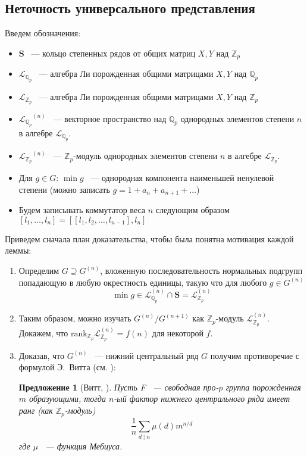 \documentclass[12pt,a4paper]{article}
\newtheorem{proposition}{Предложение}[section]
\newcommand{\Z}{\ensuremath{\mathbb{Z}}}
\newcommand{\Q}{\ensuremath{\mathbb{Q}}}
\newcommand{\LQ}{\ensuremath{\mathcal{L}_{\mathbb{Q}_p}}}
\newcommand{\LZ}{\ensuremath{\mathcal{L}_{\mathbb{Z}_p}}}
\newcommand{\LQn}{\ensuremath{\mathcal{L}^{(n)}_{\mathbb{Q}_p}}}
\newcommand{\LZn}{\ensuremath{\mathcal{L}^{(n)}_{\mathbb{Z}_p}}}
\newcommand{\Sbf}{\ensuremath{\mathbf{S}}}
\newcommand{\rank}{\ensuremath{\mathrm{rank}}}
\begin{document}
    \subsection{Неточность универсального представления}
    Введем обозначения:
    \begin{itemize}
        \item $\mathbf{S}$ ~--- кольцо степенных рядов от общих матриц $X, Y$ над $\Z_p$
        \item $\LQ$ ~--- алгебра Ли порожденная общими матрицами $X, Y$ над $\Q_p$
        \item $\LZ$ ~--- алгебра Ли порожденная общими матрицами $X, Y$ над $\Z_p$
        \item $\LQ^{(n)}$ ~--- векторное пространство над $\Q_p$ однородных элементов степени $n$ в алгебре $\LQ$.
        \item $\LZ^{(n)}$ ~---  $\Z_p$-модуль однородных элементов степени $n$ в алгебре $\LZ$.
        \item Для $g\in G$: $\min{g}$ ~--- однородная компонента наименьшей ненулевой степени (можно записать $g=1 + a_n + a_{n+1} + \ldots$)
        \item Будем записывать коммутатор веса $n$ следующим образом $[l_1, \ldots, l_n] = [[l_1, l_2, \ldots, l_{n-1}], l_n]$
    \end{itemize}
    Приведем сначала план доказательства, чтобы была понятна мотивация каждой леммы:
    \begin{enumerate}
        \item Определим $G\supseteq G^{(n)}$, вложенную последовательность нормальных подгрупп попадающую в любую окрестность единицы, такую что для любого $g\in G^{(n)}$
        \[
            \min{g} \in \LQn\cap\Sbf = \LZn
        \]
        \item Таким образом, можно изучать $G^{(n)}/G^{(n+1)}$ как $\Z_p$-модуль $\LZn$.
        Докажем, что $\rank_{\Z_p}{\LZn} = f(n)$ для некоторой $f$.
        \item Доказав, что $G^{(n)}$ ~--- нижний центральный ряд $G$ получим противоречие с формулой Э.\ Витта (см. \cite{Lubotzky}):
        \begin{proposition}[Витт, \cite{Lubotzky}]
            \label{thm:Vitt}
            Пусть F ~--- свободная про-$p$ группа порожденная $m$ образующими, тогда $n$-ый фактор нижнего центрального ряда имеет ранг (как $\Z_p$-модуль)
            \[
                \frac{1}{n}\sum\limits_{d\mid n} \mu(d) m^{n / d}
            \]
            где $\mu$ ~--- функция Мебиуса.
        \end{proposition}
    \end{enumerate}
\end{document}
